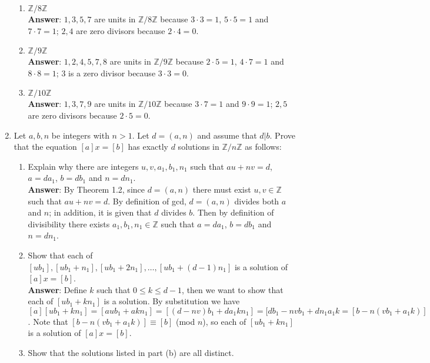 \documentclass{article}
\begin{document}
\begin{enumerate}
            \begin{enumerate}
                  \item $\mathbb{Z}/8\mathbb{Z}$\\
                        \textbf{Answer}: $1,3,5,7$ are units in $\mathbb{Z}/8\mathbb{Z}$ because $3\cdot 3=1$, $5\cdot 5=1$ and $7\cdot 7=1$; $2,4$ are zero divisors because $2\cdot 4=0$.
                  \item $\mathbb{Z}/9\mathbb{Z}$\\
                        \textbf{Answer}: $1,2,4,5,7,8$ are units in $\mathbb{Z}/9\mathbb{Z}$ because $2\cdot 5=1$, $4\cdot 7=1$ and $8\cdot 8=1$; $3$ is a zero divisor because $3\cdot 3=0$.
                  \item $\mathbb{Z}/10\mathbb{Z}$\\
                        \textbf{Answer}: $1,3,7,9$ are units in $\mathbb{Z}/10\mathbb{Z}$ because $3\cdot 7=1$ and $9\cdot 9=1$; $2,5$ are zero divisors because $2\cdot 5=0$.
            \end{enumerate}
      \item Let $a,b,n$ be integers with $n>1$. Let $d=(a,n)$ and assume that $d|b$. Prove that the equation $[a]x=[b]$ has exactly $d$ solutions in $\mathbb{Z}/n\mathbb{Z}$ as follows:
            \begin{enumerate}
                  \item Explain why there are integers $u,v,a_1,b_1,n_1$ such that $au+nv=d$, $a=da_1$, $b=db_1$ and $n=dn_1$.\\
                        \textbf{Answer}: By Theorem 1.2, since $d=(a,n)$ there must exist $u,v\in\mathbb{Z}$ such that $au+nv=d$. By definition of gcd, $d=(a,n)$ divides both $a$ and $n$; in addition, it is given that $d$ divides $b$. Then by definition of divisibility there exists $a_1,b_1,n_1\in\mathbb{Z}$ such that $a=da_1$, $b=db_1$ and $n=dn_1$.
                  \item Show that each of $[ub_1],[ub_1+n_1],[ub_1+2n_1],\ldots,[ub_1+(d-1)n_1]$ is a solution of $[a]x=[b]$.\\
                        \textbf{Answer}: Define $k$ such that $0\leq k\leq d-1$, then we want to show that each of $[ub_1+kn_1]$ is a solution. By substitution we have $[a][ub_1+kn_1]=[aub_1+akn_1]=[(d-nv)b_1+da_1kn_1]=[db_1-nvb_1+dn_1a_1k=[b-n(vb_1+a_1k)]$. Note that $[b-n(vb_1+a_1k)]\equiv [b]$ (mod $n$), so each of $[ub_1+kn_1]$ is a solution of $[a]x=[b]$.
                  \item Show that the solutions listed in part (b) are all distinct.\\

\end{enumerate}
\end{enumerate}
\end{document}
